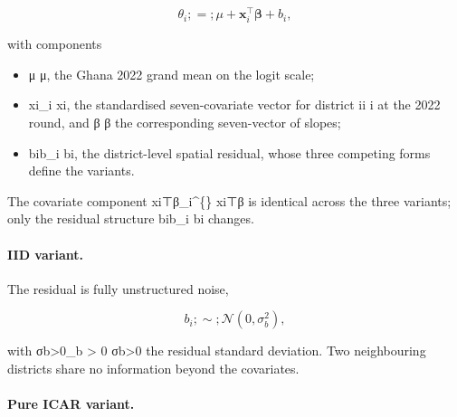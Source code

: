 \documentclass{article}
\begin{document}
\begin{equation}

\theta_i ;=; \mu + \mathbf{x}_i^{\top} \bm{\beta} + b_i,

\label{eq:m1}

\end{equation}

with components

\begin{itemize}

\item μ\mu
μ, the Ghana 2022 grand mean on the logit scale;

\item xi_i
xi​, the standardised seven-covariate vector for district ii
i at the 2022 round, and β\bm{\beta}
β the corresponding seven-vector of slopes;

\item bib_i
bi​, the district-level spatial residual, whose three competing forms define the variants.

\end{itemize}

The covariate component xi⊤β\_i\^{}\{\top\} \bm{\beta}
xi⊤\hspace{0pt}β is identical across the three variants; only the
residual structure bib\_i bi\hspace{0pt} changes.

\paragraph{IID variant.}

The residual is fully unstructured noise,

\begin{equation}

b_i ;\sim; \mathcal{N}(0, \sigma_b^{2}),

\label{eq:m1-iid}

\end{equation}

with σb\textgreater0\sigma\_b \textgreater{} 0
σb\hspace{0pt}\textgreater0 the residual standard deviation. Two
neighbouring districts share no information beyond the covariates.

\paragraph{Pure ICAR variant.}
\end{document}
